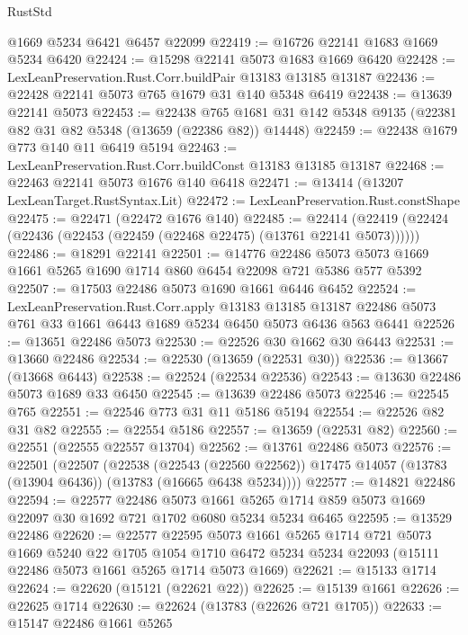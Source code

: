 \begin{lexlean}{RustStd}
\begin{coremodule}
    @1669
    @5234
    @6421
    @6457
    @22099
@22419 := @16726 @22141 @1683 @1669 @5234 @6420
@22424 := @15298 @22141 @5073 @1683 @1669 @6420
@22428 := LexLeanPreservation.Rust.Corr.buildPair @13183 @13185 @13187
@22436 := @22428 @22141 @5073 @765 @1679 @31 @140 @5348 @6419
@22438 := @13639 @22141 @5073
@22453 := @22438
    @765
    @1681
    @31
    @142
    @5348
    @9135
    (@22381 @82 @31 @82 @5348 (@13659 (@22386 @82)) @14448)
@22459 := @22438 @1679 @773 @140 @11 @6419 @5194
@22463 := LexLeanPreservation.Rust.Corr.buildConst @13183 @13185 @13187
@22468 := @22463 @22141 @5073 @1676 @140 @6418
@22471 := @13414 (@13207 LexLeanTarget.RustSyntax.Lit)
@22472 := LexLeanPreservation.Rust.constShape
@22475 := @22471 (@22472 @1676 @140)
@22485 := @22414 (@22419 (@22424 (@22436 (@22453 (@22459 (@22468 @22475) (@13761 @22141 @5073))))))
@22486 := @18291 @22141
@22501 := @14776
    @22486
    @5073
    @5073
    @1669
    @1661
    @5265
    @1690
    @1714
    @860
    @6454
    @22098
    @721
    @5386
    @577
    @5392
@22507 := @17503 @22486 @5073 @1690 @1661 @6446 @6452
@22524 := LexLeanPreservation.Rust.Corr.apply
    @13183
    @13185
    @13187
    @22486
    @5073
    @761
    @33
    @1661
    @6443
    @1689
    @5234
    @6450
    @5073
    @6436
    @563
    @6441
@22526 := @13651 @22486 @5073
@22530 := @22526 @30 @1662 @30 @6443
@22531 := @13660 @22486
@22534 := @22530 (@13659 (@22531 @30))
@22536 := @13667 (@13668 @6443)
@22538 := @22524 (@22534 @22536)
@22543 := @13630 @22486 @5073 @1689 @33 @6450
@22545 := @13639 @22486 @5073
@22546 := @22545 @765
@22551 := @22546 @773 @31 @11 @5186 @5194
@22554 := @22526 @82 @31 @82
@22555 := @22554 @5186
@22557 := @13659 (@22531 @82)
@22560 := @22551 (@22555 @22557 @13704)
@22562 := @13761 @22486 @5073
@22576 := @22501
    (@22507
      (@22538
        (@22543 (@22560 @22562))
        @17475
        @14057
        (@13783 (@13904 @6436))
        (@13783 (@16665 @6438 @5234))))
@22577 := @14821 @22486
@22594 := @22577
    @22486
    @5073
    @1661
    @5265
    @1714
    @859
    @5073
    @1669
    @22097
    @30
    @1692
    @721
    @1702
    @6080
    @5234
    @5234
    @6465
@22595 := @13529 @22486
@22620 := @22577
    @22595
    @5073
    @1661
    @5265
    @1714
    @721
    @5073
    @1669
    @5240
    @22
    @1705
    @1054
    @1710
    @6472
    @5234
    @5234
    @22093
    (@15111 @22486 @5073 @1661 @5265 @1714 @5073 @1669)
@22621 := @15133 @1714
@22624 := @22620 (@15121 (@22621 @22))
@22625 := @15139 @1661
@22626 := @22625 @1714
@22630 := @22624 (@13783 (@22626 @721 @1705))
@22633 := @15147 @22486 @1661 @5265

\end{coremodule}
\end{lexlean}
